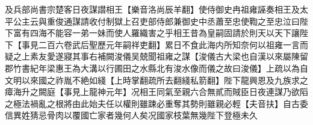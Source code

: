 及兵部尚書宗楚客日夜謀譛相王【樂音洛尚辰羊翻】使侍御史冉祖雍誣奏相王及太平公主云與重俊通謀請收付制獄上召吏部侍郎兼御史中丞蕭至忠使鞫之至忠泣曰陛下富有四海不能容一弟一妹而使人羅織害之乎相王昔為皇嗣固請於則天以天下讓陛下【事見二百六卷武后聖歷元年嗣祥吏翻】累日不食此海内所知奈何以祖雍一言而疑之上素友愛遂寢其事右補闕浚儀吴兢聞祖雍之謀【浚儀古大梁也自漢以來屬陳留郡竹書紀年梁惠王為大溝以行圃田之水縣北有浚水像而儀之故曰浚儀】上疏以為自文明以來國之祚胤不絶如綫【上時掌翻疏所去翻綫私箭翻】陛下龍興恩及九族求之瘴海升之闕庭【事見上龍神元年】况相王同氣至親六合無貳而賊臣日夜連謀乃欲䧟之極法禍亂之根將由此始夫任以權則雖踈必重奪其勢則雖親必輕【夫音扶】自古委信異姓猜忌骨肉以覆國亡家者幾何人矣况國家枝葉無幾陛下登極未久